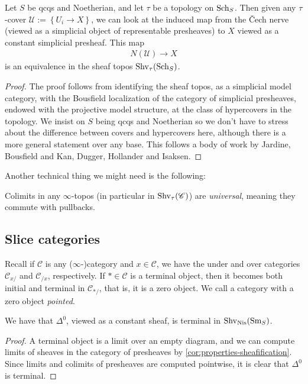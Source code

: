 \documentclass[11pt]{amsart}
\begin{document}
\begin{corollary} Let $S$ be qcqs and Noetherian, and let $\tau$ be a topology on $\mathrm{Sch}_S$. Then given any $\tau$-cover $\mathcal{U}:=\left\{ U_i \to X \right\}$, we can look at the induced map from the \v{C}ech nerve (viewed as a simplicial object of representable presheaves) to $X$ viewed as a constant simplicial presheaf. This map
\begin{align*}
    N(\mathcal{U}) \to X
\end{align*}
is an equivalence in the sheaf topos $\mathrm{Shv}_\tau(\mathrm{Sch}_S)$.
\end{corollary}
\begin{proof} The proof follows from identifying the sheaf topos, as a simplicial model category, with the Bousfield localization of the category of simplicial presheaves, endowed with the projective model structure, at the class of hypercovers in the topology. We insist on $S$ being qcqs and Noetherian so we don't have to stress about the difference between covers and hypercovers here, although there is a more general statement over any base. This follows a body of work by Jardine, Bousfield and Kan, Dugger, Hollander and Isaksen.
\end{proof}


Another technical thing we might need is the following:

\begin{proposition} 
  \cite[6.4.4.6]{HTT} Colimits in any $\infty$-topos (in particular in $\mathrm{Shv}_\tau(\mathscr{C})$) are \textit{universal}, meaning they commute with pullbacks.
\end{proposition}


\subsection{Slice categories}

Recall if $\mathscr{C}$ is any ($\infty$-)category and $x\in \mathscr{C}$, we have the under and over categories $\mathscr{C}_{x/}$ and $\mathscr{C}_{/x}$, respectively. If $\ast\in \mathscr{C}$ is a terminal object, then it becomes both initial and terminal in $\mathscr{C}_{\ast/}$, that is, it is a zero object. We call a category with a zero object \textit{pointed}.

\begin{proposition} We have that $\Delta^0$, viewed as a constant sheaf, is terminal in $\mathrm{Shv}_{\mathrm{Nis}}(\mathrm{Sm}_S)$.
\end{proposition}
\begin{proof} A terminal object is a limit over an empty diagram, and we can compute limits of sheaves in the category of presheaves by \autoref{cor:properties-sheafification}. Since limits and colimits of presheaves are computed pointwise, it is clear that $\Delta^0$ is terminal.
\end{proof}
\end{document}
